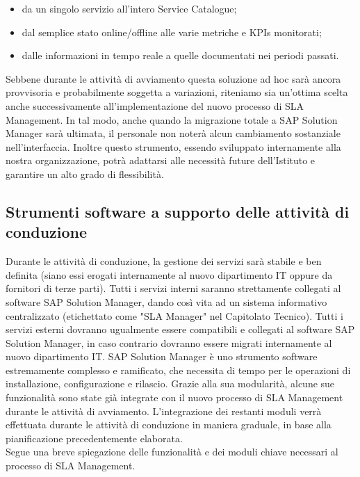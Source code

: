 \begin{itemize}
	\item da un singolo servizio all'intero Service Catalogue;
    \item dal semplice stato online/offline alle varie metriche e KPIs monitorati;
    \item dalle informazioni in tempo reale a quelle documentati nei periodi passati.
\end{itemize}

Sebbene durante le attività di avviamento questa soluzione ad hoc sarà ancora provvisoria e probabilmente soggetta a variazioni, riteniamo sia un'ottima scelta anche successivamente all'implementazione del nuovo processo di SLA Management. In tal modo, anche quando la migrazione totale a SAP Solution Manager sarà ultimata, il personale non noterà alcun cambiamento sostanziale nell'interfaccia. Inoltre questo strumento, essendo sviluppato internamente alla nostra organizzazione, potrà adattarsi alle necessità future dell'Istituto e garantire un alto grado di flessibilità.

\subsection{Strumenti software a supporto delle attività di conduzione}

Durante le attività di conduzione, la gestione dei servizi sarà stabile e ben definita (siano essi erogati internamente al nuovo dipartimento IT oppure da fornitori di terze parti). Tutti i servizi interni saranno strettamente collegati al software SAP Solution Manager, dando così vita ad un sistema informativo centralizzato (etichettato come "SLA Manager" nel Capitolato Tecnico). Tutti i servizi esterni dovranno ugualmente essere compatibili e collegati al software SAP Solution Manager, in caso contrario dovranno essere migrati internamente al nuovo dipartimento IT. SAP Solution Manager è uno strumento software estremamente complesso e ramificato, che necessita di tempo per le operazioni di installazione, configurazione e rilascio. Grazie alla sua modularità, alcune sue funzionalità sono state già integrate con il nuovo processo di SLA Management durante le attività di avviamento. L'integrazione dei restanti moduli verrà effettuata durante le attività di conduzione in maniera graduale, in base alla pianificazione precedentemente elaborata.
\\
Segue una breve spiegazione delle funzionalità e dei moduli chiave necessari al processo di SLA Management.

